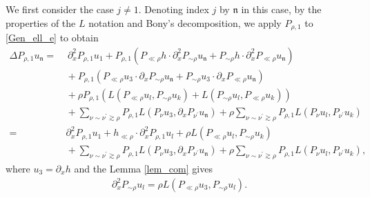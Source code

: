 \documentclass[11pt,letterpaper,reqno]{amsart}
\numberwithin{equation}{section}
\theoremstyle{definition}
\theoremstyle{remark}
\begin{document}
We first consider the case \(j \neq 1\). Denoting index $j$ by $\mathfrak{n}$ in this case, by the properties of the \(L\) notation and Bony's decomposition, we  apply \( P_{\rho,1} \) to \eqref{Gen_ell_e} to obtain
 \begin{align} 
     \Delta 	P_{\rho,1}   u_{\mathfrak{n}}=& \, \, \partial_x^2 P_{\rho, 1}u_1 +  P_{\rho,1 } ( P_{\ll \rho} h \cdot  \partial_x^2P_{ \sim \rho} 
 u_{\mathfrak{n}}+ P_{ \sim \rho} h \cdot  \partial_x^2P_{\ll\rho  } 
 u_{\mathfrak{n}}) \nonumber \\
	&\, + P_{\rho,1 } ( P_{\ll \rho} u_3 \cdot  \partial_x P_{ \sim \rho} 
 u_{\mathfrak{n}}+ P_{  \sim \rho} u_3 \cdot  \partial_xP_{\ll\rho  } 
 u_{\mathfrak{n}})  \label{P_Nn}\\
 	&\, + \rho  P_{\rho,1 } ( L(P_{\ll \rho} u_l,  P_{ \sim \rho} 
 u_{k})+ L(P_{  \sim \rho} u_l,   P_{\ll\rho  } 
 u_{k})) \nonumber\\
 &\,+   \sum_{\nu \sim \nu^\prime \gtrsim \rho}P_{\rho,1 }    L (  P_\nu u_3,   \partial_x P_{\nu^\prime } 
 u_{\mathfrak{n}})+ \rho \sum_{\nu \sim \nu^\prime \gtrsim \rho} P_{\rho,1 }   L (P_{\nu} u_l,     P_{\nu^\prime } 
u_k)   \nonumber\\
\nonumber=&\,  \partial_x^2 P_{\rho, 1}u_1+      h_{\ll \rho} \cdot \partial_x^2 P_{\rho , 1} u_{l}   +      \rho   L( P_{\ll \rho} u_l, P_{ \sim \rho} u_{k}  ) \\
 &\,+  \sum_{\nu \sim \nu^\prime \gtrsim \rho}P_{\rho,1 }    L (  P_\nu u_3,   \partial_x P_{\nu^\prime } 
 u_{\mathfrak{n}}) + \rho \sum_{\nu \sim \nu^\prime \gtrsim \rho}  P_{\rho,1 }   L (P_{\nu} u_l,     P_{\nu^\prime } 
u_k)  , \nonumber
 \end{align}
where \( u_3 =\partial_x h\) and the Lemma \ref{lem_com} gives
\begin{align*}
     [P_{\rho,1}, P_{\ll \rho} h]\partial_x^2 P_{ \sim \rho } u_{l}  =  \rho L( P_{\ll \rho} u_3,   P_{ \sim \rho } u_{l}).   
\end{align*}
 
\end{document}
